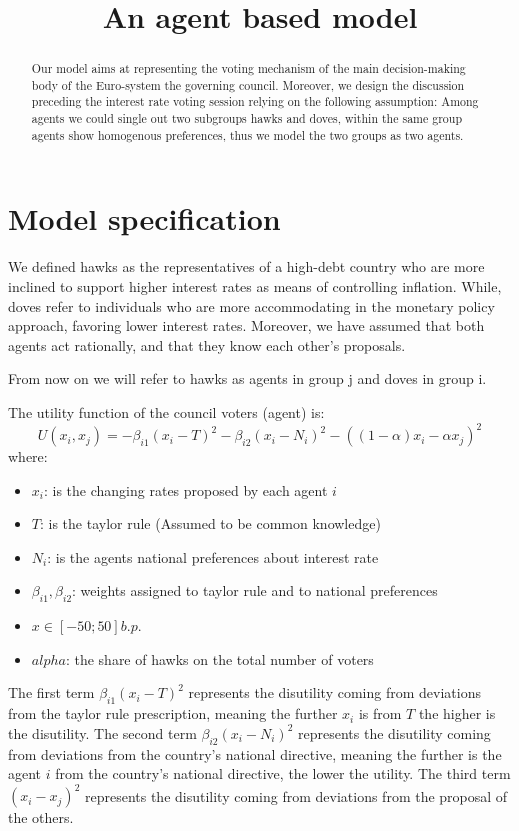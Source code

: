 \documentclass[12pt]{article}
\title{An agent based model }
\author{ }
\begin{document}
\maketitle
\begin{abstract}
    Our model aims at representing the  voting mechanism of the main decision-making body of the Euro-system the
    governing council. Moreover, we design the discussion preceding the interest rate voting session relying on the
    following assumption: Among agents we could single out two subgroups hawks and doves, within the same group agents
    show homogenous preferences, thus we model the two groups as two agents. 
    
    
\end{abstract}
\section{Model specification}

We defined hawks as the representatives of a high-debt country who are more inclined to support higher interest rates as
means of controlling inflation. While, doves refer to individuals who are more accommodating in the monetary policy approach,
favoring lower interest rates. Moreover, we have assumed  that both agents act rationally, and that they know each
other's proposals. \par
From now on we will refer to hawks as agents in group j and doves in group i.

\vspace{8pt}
The utility function of the council voters (agent) is:
\[ U(x_i,x_{j})=-\beta_{i1}(x_i-T)^2-\beta_{i2} (x_i-N_i)^2 - ((1 - \alpha) x_i - \alpha x_j)^2\]
where:
\begin{itemize}
    \item $x_i$: is the changing rates proposed by each agent $i$
    \item $T$: is the taylor rule (Assumed to be common knowledge)
    \item $N_i$: is the agents national preferences about interest rate
    \item $\beta_{i1},\beta_{i2}$: weights assigned to taylor rule and to national preferences
    \item $x\in[-50;50] b.p.$
    \item $alpha$: the share of hawks on the total number of voters
\end{itemize}
The first term $\beta_{i1}(x_i-T)^2$ represents the disutility coming from deviations from the taylor rule prescription,
meaning the further  $x_i$ is from $T$ the higher is the disutility. The second term $ \beta_{i2}(x_i-N_i)^2$ represents
the disutility coming  from deviations from the country's national directive, meaning the further is the agent $i$ from
the country's national directive, the lower the utility. The third term $(x_i-x_j)^2$
represents the disutility coming  from deviations from the proposal of the others.
\end{document}
